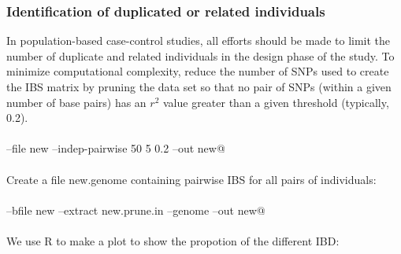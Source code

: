 \documentclass{article}\usepackage[]{graphicx}\usepackage[]{color}
\begin{document}
\subsubsection{Identification of duplicated or related individuals}
In population-based case-control studies, all efforts should be made to limit the number of duplicate and related individuals in the design phase of the study. To minimize computational complexity, reduce the number of SNPs used to create the IBS matrix by pruning the data set so that no pair of SNPs (within a given number of base pairs) has an $r^2$ value greater than a given threshold (typically, 0.2).
\\\\\verb@plink --file new --indep-pairwise 50 5 0.2 --out new@\\\\
Create a file new.genome containing pairwise IBS for all pairs of individuals:
\\\\\verb@plink --bfile new --extract new.prune.in --genome --out new@\\\\
We use R to make a plot to show the propotion of the different IBD:
\end{document}
